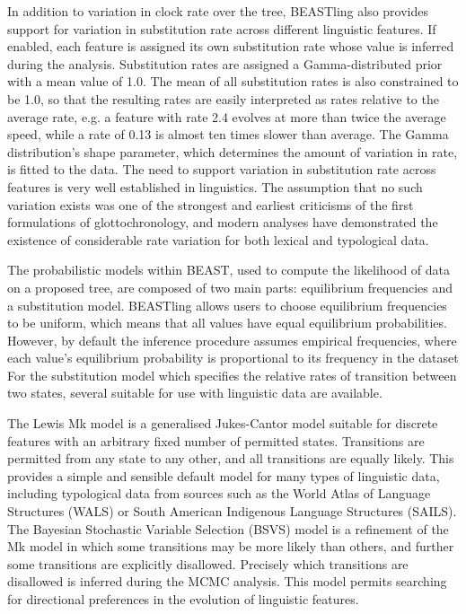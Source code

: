 \documentclass[10pt,a4paper]{article}
\begin{document}
In addition to variation in clock rate over the tree, BEASTling also provides support for variation in substitution rate across different linguistic features.  If enabled, each feature is assigned its own substitution rate whose value is inferred during the analysis.  Substitution rates are assigned a Gamma-distributed prior with a mean value of 1.0.  The mean of all substitution rates is also constrained to be 1.0, so that the resulting rates are easily interpreted as rates relative to the average rate, e.g. a feature with rate 2.4 evolves at more than twice the average speed, while a rate of 0.13 is almost ten times slower than average.  The Gamma distribution's shape parameter, which determines the amount of variation in rate, is fitted to the data.  The need to support variation in substitution rate across features is very well established in linguistics.  The assumption that no such variation exists was one of the strongest and earliest criticisms of the first formulations of glottochronology, and modern analyses have demonstrated the existence of considerable rate variation for both lexical\cite{Pagel2007} and typological\cite{Greenhill2010,Dediu2011} data.

The probabilistic models within BEAST, used to compute the likelihood of data on a proposed tree, are composed of two main parts: equilibrium frequencies and a substitution model.  BEASTling allows users to choose equilibrium frequencies to be uniform, which means that all values have equal equilibrium probabilities. However, by default the inference procedure assumes empirical frequencies, where each value's equilibrium probability is proportional to its frequency in the dataset  For the substitution model which specifies the relative rates of transition between two states, several suitable for use with linguistic data are available.

The Lewis Mk model\cite{Lewis2001} is a generalised Jukes-Cantor model suitable for discrete features with an arbitrary fixed number of permitted states.  Transitions are permitted from any state to any other, and all transitions are equally likely.  This provides a simple and sensible default model for many types of linguistic data, including typological data from sources such as the World Atlas of Language Structures\cite{Dryer2013} (WALS) or South American Indigenous Language Structures\cite{Muysken2014} (SAILS).  The Bayesian Stochastic Variable Selection (BSVS) model is a refinement of the Mk model in which some transitions may be more likely than others, and further some transitions are explicitly disallowed.  Precisely which transitions are disallowed is inferred during the MCMC analysis.  This model permits searching for directional preferences in the evolution of linguistic features.
\end{document}
